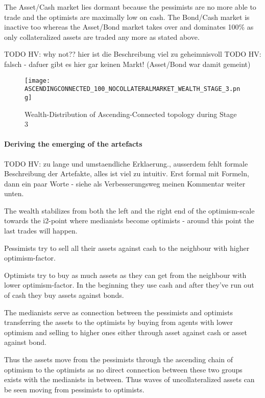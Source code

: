 \documentclass[Bachelorarbeit.tex]{subfiles}
\begin{document}
\medskip

The Asset/Cash market lies dormant because the pessimists are no more able to trade and the optimists are maximally low on cash. The Bond/Cash market is inactive too whereas the Asset/Bond market takes over and dominates 100\% as only collateralized assets are traded any more as stated above.

TODO HV: why not?? hier ist die Beschreibung viel zu geheimnisvoll
TODO HV: falsch - dafuer gibt es hier gar keinen Markt! (Asset/Bond war damit gemeint)

\begin{figure}[H]
	\centering
  \texttt{[image: ASCENDINGCONNECTED\_100\_NOCOLLATERALMARKET\_WEALTH\_STAGE\_3.png]}
  	\caption{Wealth-Distribution of Ascending-Connected topology during Stage 3}
	\label{fig:markets_ASCENDINGCONNECTED_100_NOCOLLATERALMARKET_WEALTH_STAGE_3}
\end{figure}

\paragraph{Deriving the emerging of the artefacts}
TODO HV: zu lange und umstaendliche Erklaerung., ausserdem fehlt formale Beschreibung der Artefakte, alles ist viel zu intuitiv. Erst formal mit Formeln, dann ein paar Worte - siehe als Verbesserungsweg meinen Kommentar weiter unten.


The wealth stabilizes from both the left and the right end of the optimism-scale towards the i2-point where medianists become optimists - around this point the last trades will happen.

\medskip 

Pessimists try to sell all their assets against cash to the neighbour with higher optimism-factor.

\medskip 

Optimists try to buy as much assets as they can get from the neighbour with lower optimism-factor. In the beginning they use cash and after they've run out of cash they buy assets against bonds.

\medskip 

The medianists serve as connection between the pessimists and optimists transferring the assets to the optimists by buying from agents with lower optimism and selling to higher ones either through asset against cash or asset against bond.

\medskip 

Thus the assets move from the pessimists through the ascending chain of optimism to the optimists as no direct connection between these two groups exists with the medianists in between. Thus waves of uncollateralized assets can be seen moving from pessimists to optimists.
\end{document}
